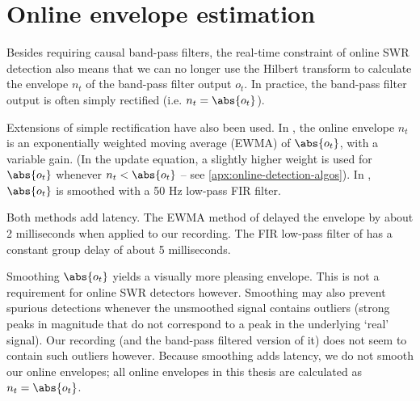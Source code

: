 



\section{Online envelope estimation}

Besides requiring causal band-pass filters, the real-time constraint of online SWR detection also means that we can no longer use the Hilbert transform to calculate the envelope $n_t$ of the band-pass filter output $o_t$. In practice, the band-pass filter output is often simply rectified (i.e. $n_t = \abs{o_t}$).

Extensions of simple rectification have also been used. In , the online envelope $n_t$ is an exponentially weighted moving average (EWMA) of $\abs{o_t}$, with a variable gain. (In the update equation, a slightly higher weight is used for $\abs{o_t}$  whenever $n_t < \abs{o_t}$ -- see \cref{apx:online-detection-algos}). In , $\abs{o_t}$ is smoothed with a 50 Hz low-pass FIR filter.

Both methods add latency. The EWMA method of \citeauthor*{Jadhav2012} delayed the envelope by about 2 milliseconds when applied to our recording. The FIR low-pass filter of \citeauthor*{Dutta2018} has a constant group delay of about 5 milliseconds.

Smoothing $\abs{o_t}$ yields a visually more pleasing envelope. This is not a requirement for online SWR detectors however. Smoothing may also prevent spurious detections whenever the unsmoothed signal contains outliers (strong peaks in magnitude that do not correspond to a peak in the underlying `real' signal). Our recording (and the band-pass filtered version of it) does not seem to contain such outliers however. Because smoothing adds latency, we do not smooth our online envelopes; all online envelopes in this thesis are calculated as $n_t = \abs{o_t}$.
